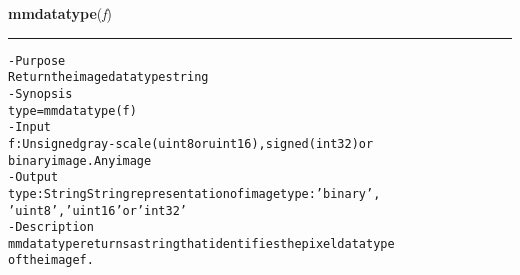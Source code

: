     \label{multireg:num_pymorph:mmdatatype}
    \vspace{0.5ex}

    \begin{boxedminipage}{\textwidth}

    \raggedright \textbf{mmdatatype}(\textit{f})

    \vspace{-1.5ex}

    \rule{\textwidth}{0.5\fboxrule}
\begin{alltt}
- Purpose
    Return the image datatype string
- Synopsis
    type = mmdatatype(f)
- Input
    f: Unsigned gray-scale (uint8 or uint16), signed (int32) or
       binary image. Any image
- Output
    type: String String representation of image type: 'binary',
          'uint8', 'uint16' or 'int32'
- Description
    mmdatatype returns a string that identifies the pixel datatype
    of the image f .\end{alltt}

    \vspace{1ex}

    \end{boxedminipage}

    \label{multireg:num_pymorph:mmdil}
    \vspace{0.5ex}

